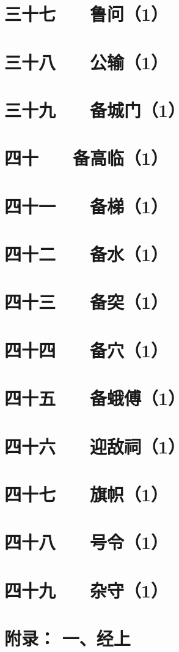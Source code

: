 \documentclass[12pt,UTF8]{ctexbook}
\begin{document}
\chapter{三十七　　鲁问（1）}
\chapter{三十八　　公输（1）}
\chapter{三十九　　备城门（1）}
\chapter{四十　　备高临（1）}
\chapter{四十一　　备梯（1）}
\chapter{四十二　　备水（1）}
\chapter{四十三　　备突（1）}
\chapter{四十四　　备穴（1）}
\chapter{四十五　　备蛾傅（1）}
\chapter{四十六　　迎敌祠（1）}
\chapter{四十七　　旗帜（1）}
\chapter{四十八　　号令（1）      }   
\chapter{四十九　　杂守（1）     }     
\chapter{附录： 一、经上}
\end{document}
